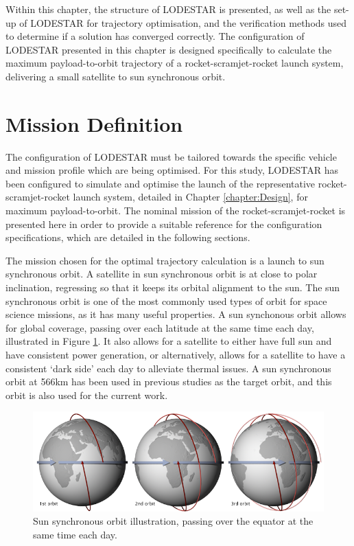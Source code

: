  Within this chapter, the structure of LODESTAR is presented, as well as the set-up of LODESTAR for trajectory optimisation, and the verification methods used to determine if a solution has converged correctly.
 The configuration of LODESTAR presented in this chapter is designed specifically to calculate the maximum payload-to-orbit trajectory of a rocket-scramjet-rocket launch system, delivering a small satellite to sun synchronous orbit. 
 



\section{Mission Definition}\label{sec:mission}
The configuration of LODESTAR must be tailored towards the specific vehicle and mission profile which are being optimised. For this study, LODESTAR has been configured to simulate and optimise the launch of the representative rocket-scramjet-rocket launch system, detailed in Chapter \ref{chapter:Design}, for maximum payload-to-orbit.
The nominal mission of the rocket-scramjet-rocket is presented here in order to provide a suitable reference for the configuration specifications, which are detailed in the following sections. 

The mission chosen for the optimal trajectory calculation is a launch to sun synchronous orbit. 
A satellite in sun synchronous orbit is at close to polar inclination, regressing so that it keeps its orbital alignment to the sun. The sun synchronous orbit is one of the most commonly used types of orbit for space science missions, as it has many useful properties\cite{Boain2004}. A sun synchonous orbit allows for global coverage, passing over each latitude at the same time each day, illustrated in Figure \ref{fig:SSO}. It also allows for a satellite to either have full sun and have consistent power generation, or alternatively, allows for a satellite to have a consistent `dark side' each day to alleviate thermal issues\cite{Boain2004}. A sun synchronous orbit at 566km has been used in previous studies as the target orbit\cite{Preller2017b}, and this orbit is also used for the current work. 
\begin{figure}[ht]
	\centering
	\includegraphics[width=0.8\linewidth]{figures/4_LODESTAR/SSO}
	\caption{Sun synchronous orbit illustration, passing over the equator at the same time each day\cite{NASASSO}.}
	\label{fig:SSO}
\end{figure}


